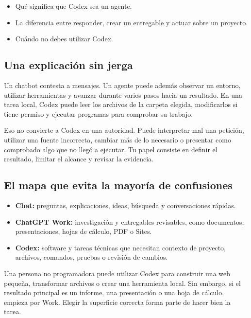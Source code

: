 \documentclass[10pt,a4paper,openany]{book}
\providecommand{\tightlist}{\setlength{\itemsep}{0.18em}\setlength{\parskip}{0pt}}
\begin{document}
\begin{itemize}
\tightlist
\item
  Qué significa que Codex sea un agente.
\item
  La diferencia entre responder, crear un entregable y actuar sobre un
  proyecto.
\item
  Cuándo no debes utilizar Codex.
\end{itemize}

\subsection{Una explicación sin
jerga}\label{una-explicaciuxf3n-sin-jerga}

Un chatbot contesta a mensajes. Un agente puede además observar un
entorno, utilizar herramientas y avanzar durante varios pasos hacia un
resultado. En una tarea local, Codex puede leer los archivos de la
carpeta elegida, modificarlos si tiene permiso y ejecutar programas para
comprobar su trabajo.

Eso no convierte a Codex en una autoridad. Puede interpretar mal una
petición, utilizar una fuente incorrecta, cambiar más de lo necesario o
presentar como comprobado algo que no llegó a ejecutar. Tu papel
consiste en definir el resultado, limitar el alcance y revisar la
evidencia.

\subsection{El mapa que evita la mayoría de
confusiones}\label{el-mapa-que-evita-la-mayoruxeda-de-confusiones}

\begin{itemize}
\tightlist
\item
  \textbf{Chat:} preguntas, explicaciones, ideas, búsqueda y
  conversaciones rápidas.
\item
  \textbf{ChatGPT Work:} investigación y entregables revisables, como
  documentos, presentaciones, hojas de cálculo, PDF o Sites.
\item
  \textbf{Codex:} software y tareas técnicas que necesitan contexto de
  proyecto, archivos, comandos, pruebas o revisión de cambios.
\end{itemize}

Una persona no programadora puede utilizar Codex para construir una web
pequeña, transformar archivos o crear una herramienta local. Sin
embargo, si el resultado principal es un informe, una presentación o una
hoja de cálculo, empieza por Work. Elegir la superficie correcta forma
parte de hacer bien la tarea.
\end{document}
